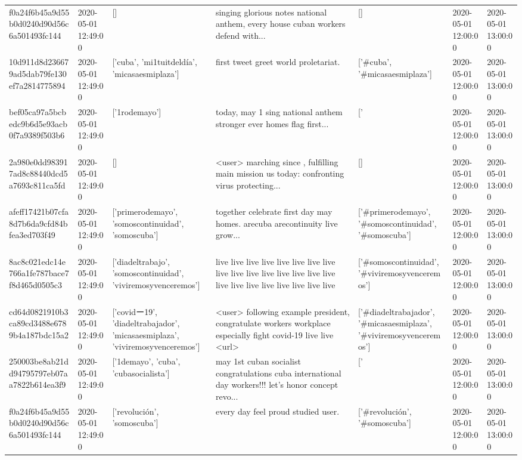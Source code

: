 \begin{tabular}{lllllll}
f0a24f6b45a9d55b0d0240d90d56c6a501493fc144 & 2020-05-01 12:49:00 & [] & singing glorious notes national anthem, every house cuban workers defend with... & [] & 2020-05-01 12:00:00 & 2020-05-01 13:00:00 \\
10d911d8d236679ad5dab79fe130ef7a2814775894 & 2020-05-01 12:49:00 & ['cuba', 'mi1tuitdeldía', 'micasaesmiplaza'] & first tweet greet world proletariat. & ['#cuba', '#micasaesmiplaza'] & 2020-05-01 12:00:00 & 2020-05-01 13:00:00 \\
bef05ca97a5bcbedc9b6d5e93acb0f7a9389f503b6 & 2020-05-01 12:49:00 & ['1rodemayo'] & today, may 1 sing national anthem stronger ever homes flag first... & ['#1rodemayo'] & 2020-05-01 12:00:00 & 2020-05-01 13:00:00 \\
2a980e0dd983917ad8c88440dcd5a7693c811ca5fd & 2020-05-01 12:49:00 & [] & <user> marching since , fulfilling main mission us today: confronting virus protecting... & [] & 2020-05-01 12:00:00 & 2020-05-01 13:00:00 \\
afeff17421b07cfa8d7b6da9cfd84bfea3ed703f49 & 2020-05-01 12:49:00 & ['primerodemayo', 'somoscontinuidad', 'somoscuba'] & together celebrate first day may homes. arecuba arecontinuity live grow... & ['#primerodemayo', '#somoscontinuidad', '#somoscuba'] & 2020-05-01 12:00:00 & 2020-05-01 13:00:00 \\
8ac8c021edc14e766a1fe787bace7f8d465d0505c3 & 2020-05-01 12:49:00 & ['diadeltrabajo', 'somoscontinuidad', 'viviremosyvenceremos'] & live live live live live live live live live live live live live live live live live live live live live live live live & ['#somoscontinuidad', '#viviremosyvenceremos'] & 2020-05-01 12:00:00 & 2020-05-01 13:00:00 \\
cd64d0821910b3ca89cd3488e6789b4a187bdc15a2 & 2020-05-01 12:49:00 & ['covidー19', 'diadeltrabajador', 'micasaesmiplaza', 'viviremosyvenceremos'] & <user> following example president, congratulate workers workplace especially fight covid-19 live live <url> & ['#diadeltrabajador', '#micasaesmiplaza', '#viviremosyvenceremos'] & 2020-05-01 12:00:00 & 2020-05-01 13:00:00 \\
250003be8ab21dd94795797eb07aa7822b614ea3f9 & 2020-05-01 12:49:00 & ['1demayo', 'cuba', 'cubasocialista'] & may 1st cuban socialist congratulations cuba international day workers!!! let's honor concept revo... & ['#1demayo', '#cuba', '#cubasocialista'] & 2020-05-01 12:00:00 & 2020-05-01 13:00:00 \\
f0a24f6b45a9d55b0d0240d90d56c6a501493fc144 & 2020-05-01 12:49:00 & ['revolución', 'somoscuba'] & every day feel proud studied user. & ['#revolución', '#somoscuba'] & 2020-05-01 12:00:00 & 2020-05-01 13:00:00 \\

\end{tabular}
